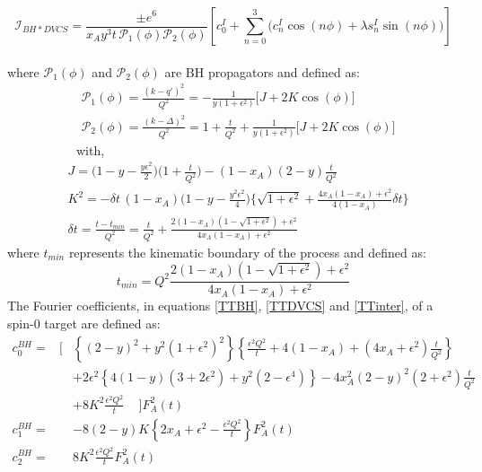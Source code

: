 \begin{equation}
\mathcal{I}_{BH*DVCS} =  \frac{\pm e^{6}}{x_A y^{3} t \, \mathcal{P}_{1}(\phi) 
\mathcal{P}_{2}(\phi)} \left[ c_{0}^{I} + \sum_{n=0}^{3} \Bigg( c_{n}^{I} \cos(n \phi) + \lambda s_{n}^{I} \sin(n \phi) \Bigg) \right] 
\label{TTinter} 
\end{equation}
\\
\normalsize
where $\mathcal{P}_{1}(\phi)$ and $\mathcal{P}_{2}(\phi)$ are BH propagators and defined as:
\small
\begin{align}
&\mathcal{P}_{1}(\phi) = \frac{(k - q')^{2}}{Q^{2}} = - \frac{1}{y (1 + \epsilon^{2})} 
\big[ J + 2 K \cos(\phi) \big] \\
&\mathcal{P}_{2}(\phi) = \frac{(k - \Delta)^{2}}{Q^{2}} = 1 + \frac{t}{Q^{2}} + 
\frac{1}{y (1 + \epsilon^{2})} \big[ J + 2 K \cos(\phi) \big]
\end{align}
~~~~~~~~~~~with,
\begin{align}
& J = \bigg( 1 - y - \frac{y \epsilon^{2}}{2} \bigg) \bigg(1 + \frac{t}{Q^{2}} \bigg) - 
(1 - x_{A})(2 - y) \frac{t}{Q^{2}} \\
& K^{2} = - \delta t \, (1 - x_{A}) \bigg( 1 - y - \frac{y^{2} \epsilon^{2}}{4} \bigg) 
\bigg\{ \sqrt{1 + \epsilon^{2}} + \frac{4 x_{A} (1-x_{A}) + \epsilon^{2}}{4 (1 - x_{A})}
\delta t \bigg\} \\
& \delta t = \frac{t - t_{min}}{Q^{2}} = \frac{t}{Q^{2}} + \frac{2(1-x_{A}) \left(1- \sqrt{1 + 
\epsilon^{2}} \right) + \epsilon^{2}}{4 x_{A} (1- x_{A}) + \epsilon^{2}}
\end{align}
\normalsize
where $t_{min}$ represents the kinematic boundary of the process and defined as:
\small
\begin{equation}
t_{min} = Q^2 \frac{2(1-x_A)(1 - \sqrt{1+\epsilon^2}) + \epsilon^2}{4 x_A(1-x_A) + \epsilon^2}
\end{equation}
\normalsize
The Fourier coefficients, in equations \ref{TTBH}, \ref{TTDVCS} and \ref{TTinter}, of a spin-0 target are defined as:
\small
\begin{eqnarray}
c_0^{BH} = & \bigg[ & \left\{ {(2-y)}^2 + y^2{(1+\epsilon^2)}^2 \right\} 
\left\{ \frac{\epsilon^2 Q^2}{t} + 4 (1-x_A) + (4x_A+\epsilon^2) \frac{t}{Q^2} 
\right\} \nonumber \\
& \phantom{\bigg[} & + 2 \epsilon^2 \left\{ 4(1-y)(3+2\epsilon^2) + y^2(2-\epsilon^4) 
\right\} - 4 x_A^2{(2-y)}^2 (2+\epsilon^2) \frac{t}{Q^2} \nonumber \\
& \phantom{\bigg[} & + 8 K^2 \frac{\epsilon^2 Q^2}{t} \,\,\,\,\,\,\, \bigg] F_A^2(t)  \\
c_1^{BH} = & \phantom{\bigg[} & -8 (2-y) K \left\{ 2 x_A + \epsilon^2 - 
\frac{\epsilon^2 Q^2}{t} \right\} F_A^2(t)  \\
c_2^{BH} = & \phantom{\bigg[} & 8 K^2 \frac{\epsilon^2 Q^2}{t} F_A^2(t) 
\end{eqnarray} 
